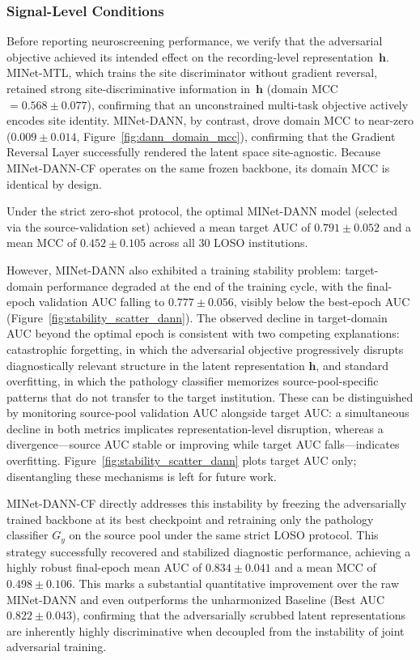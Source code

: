 \documentclass[preprint,12pt]{elsarticle}
\begin{document}
\subsubsection{Signal-Level Conditions}
\label{subsubsec:dann_clinical}
Before reporting neuroscreening performance, we verify that the
adversarial objective achieved its intended effect on the
recording-level representation~$\mathbf{h}$.
MINet-MTL, which trains the site discriminator without gradient
reversal, retained strong site-discriminative information in~$\mathbf{h}$ (domain MCC $= 0.568 \pm 0.077$), confirming that an unconstrained
multi-task objective actively encodes site identity.
MINet-DANN, by contrast, drove domain MCC to near-zero
($0.009 \pm 0.014$, Figure~\ref{fig:dann_domain_mcc}),
confirming that the Gradient Reversal Layer successfully rendered
the latent space site-agnostic.
Because MINet-DANN-CF operates on the same frozen backbone, its
domain MCC is identical by design.

Under the strict zero-shot protocol, the optimal MINet-DANN model (selected via the source-validation set) achieved a mean target AUC of $0.791 \pm 0.052$ and a mean MCC of $0.452 \pm 0.105$ across all 30 LOSO institutions.

However, MINet-DANN also exhibited a training stability problem: target-domain performance degraded at the end of the training cycle, with the final-epoch validation AUC falling to $0.777 \pm 0.056$, visibly below the best-epoch AUC (Figure~\ref{fig:stability_scatter_dann}). The observed decline in target-domain AUC beyond the optimal epoch is consistent with two competing explanations: catastrophic forgetting, in which the adversarial objective progressively disrupts diagnostically relevant structure in the latent representation $\mathbf{h}$, and standard overfitting, in which the pathology classifier memorizes source-pool-specific patterns that do not transfer to the target institution. These can be distinguished by monitoring source-pool validation AUC alongside target AUC: a simultaneous decline in both metrics implicates representation-level disruption, whereas a divergence—source AUC stable or improving while target AUC falls—indicates overfitting. Figure~\ref{fig:stability_scatter_dann} plots target AUC only; disentangling these mechanisms is left for future work.

MINet-DANN-CF directly addresses this instability by freezing the adversarially trained backbone at its best checkpoint and retraining only the pathology classifier $G_y$ on the source pool under the same strict LOSO protocol. This strategy successfully recovered and stabilized diagnostic performance, achieving a highly robust final-epoch mean AUC of $0.834 \pm 0.041$ and a mean MCC of $0.498 \pm 0.106$. This marks a substantial quantitative improvement over the raw MINet-DANN and even outperforms the unharmonized Baseline (Best AUC $0.822 \pm 0.043$), confirming that the adversarially scrubbed latent representations are inherently highly discriminative when decoupled from the instability of joint adversarial training.
\end{document}
